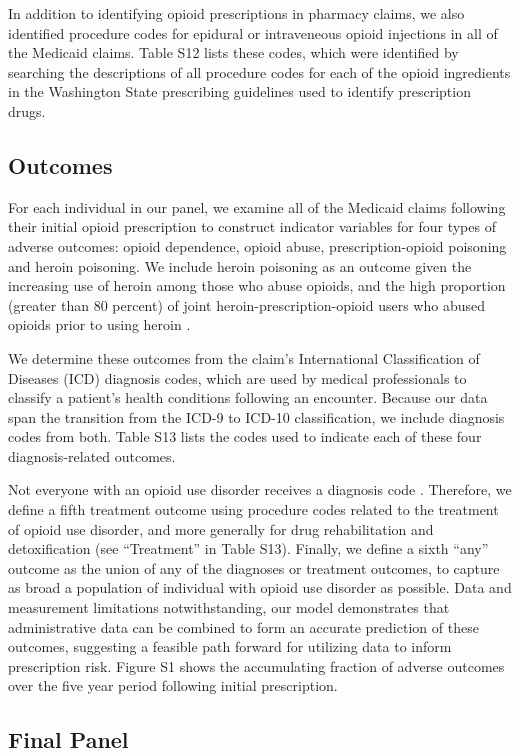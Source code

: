 \documentclass[9pt,twoside]{pnas-new}
\begin{document}
In addition to identifying opioid prescriptions in pharmacy claims, we also identified procedure codes for epidural or intraveneous opioid injections in all of the Medicaid claims. Table S12 lists these codes, which were identified by searching the descriptions of all procedure codes for each of the opioid ingredients in the Washington State prescribing guidelines used to identify prescription drugs.

\subsection{Outcomes}

For each individual in our panel, we examine all of the Medicaid claims following their initial opioid prescription to construct indicator variables for four types of adverse outcomes: opioid dependence, opioid abuse, prescription-opioid poisoning and heroin poisoning. We include heroin poisoning as an outcome given the increasing use of heroin among those who abuse opioids, and the high proportion (greater than 80 percent) of joint heroin-prescription-opioid users who abused opioids prior to using heroin \cite{jones}.

We determine these outcomes from the claim's International Classification of Diseases (ICD) diagnosis codes, which are used by medical professionals to classify a patient's health conditions following an encounter. Because our data span the transition from the ICD-9 to ICD-10 classification, we include diagnosis codes from both. Table S13 lists the codes used to indicate each of these four diagnosis-related outcomes. 

Not everyone with an opioid use disorder receives a diagnosis code \cite{carrell, barocas}. Therefore, we define a fifth treatment outcome using procedure codes related to the treatment of opioid use disorder, and more generally for drug rehabilitation and detoxification (see ``Treatment'' in Table S13). Finally, we define a sixth ``any'' outcome as the union of any of the diagnoses or treatment outcomes, to capture as broad a population of individual with opioid use disorder as possible. Data and measurement limitations notwithstanding, our model demonstrates that administrative data can be combined to form an accurate prediction of these outcomes, suggesting a feasible path forward for utilizing data to inform prescription risk. Figure S1 shows the accumulating fraction of adverse outcomes over the five year period following initial prescription.

\subsection{Final Panel}
\end{document}
